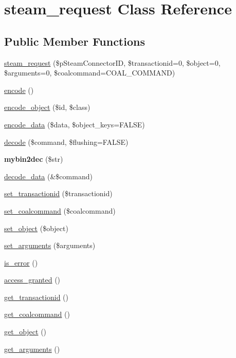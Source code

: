 \hypertarget{classsteam__request}{
\section{steam\_\-request Class Reference}
\label{classsteam__request}
}
\subsection*{Public Member Functions}
\begin{DoxyCompactItemize}
\item 
\hyperlink{classsteam__request_a3359536d9fbed21b5c92f7ca4233100c}{steam\_\-request} (\$pSteamConnectorID, \$transactionid=0, \$object=0, \$arguments=0, \$coalcommand=COAL\_\-COMMAND)
\item 
\hyperlink{classsteam__request_a06dd223de8cb1d36db6a4f60e922be48}{encode} ()
\item 
\hyperlink{classsteam__request_a98abf9b327a3e8b0aaada3f4b198f8b9}{encode\_\-object} (\$id, \$class)
\item 
\hyperlink{classsteam__request_ac34266eb4aafb9e9410e4b861965be4a}{encode\_\-data} (\$data, \$object\_\-keys=FALSE)
\item 
\hyperlink{classsteam__request_a9dc54708dbe1272e5a67c382e2afc11f}{decode} (\$command, \$flushing=FALSE)
\item 
\hypertarget{classsteam__request_aa2b63cb77e7622baa3bf3a81d5c7b523}{
{\bfseries mybin2dec} (\$str)}
\label{classsteam__request_aa2b63cb77e7622baa3bf3a81d5c7b523}

\item 
\hyperlink{classsteam__request_afc95c5a5bf35dbf04432c0338c537aae}{decode\_\-data} (\&\$command)
\item 
\hyperlink{classsteam__request_a431f87fbb98f32ce75170c8afb22b8ef}{set\_\-transactionid} (\$transactionid)
\item 
\hyperlink{classsteam__request_acae52c0e19c77f761c5ac1de227715eb}{set\_\-coalcommand} (\$coalcommand)
\item 
\hyperlink{classsteam__request_aa85efe7a241b132d317227b4caf03b38}{set\_\-object} (\$object)
\item 
\hyperlink{classsteam__request_ae0bb6e315b0326995e7afae5954d65ea}{set\_\-arguments} (\$arguments)
\item 
\hyperlink{classsteam__request_adacd2e162cd4ecc6a15286b4af17ff71}{is\_\-error} ()
\item 
\hyperlink{classsteam__request_abc4140a5412bb0a22f3b2005d564ce63}{access\_\-granted} ()
\item 
\hyperlink{classsteam__request_af1904de23a5b4efaeaf800d616dad2ba}{get\_\-transactionid} ()
\item 
\hyperlink{classsteam__request_ac470ecf247a8d0c494ab5cfd0dc79253}{get\_\-coalcommand} ()
\item 
\hyperlink{classsteam__request_a92033f08348027445d330a4fbecf712c}{get\_\-object} ()
\item 
\hyperlink{classsteam__request_af802cb45cf5ad8d680adda24472ff7b5}{get\_\-arguments} ()
\end{DoxyCompactItemize}
